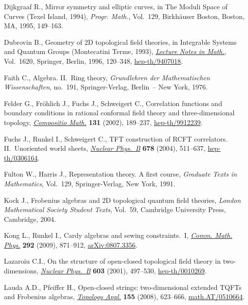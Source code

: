 \documentclass[pdftex]{sigma}
\begin{document}
\begin{thebibliography}{99}
Dijkgraaf  R.,
Mirror symmetry and elliptic curves, in The Moduli Space of Curves (Texel Island, 1994),
{\it Progr. Math.}, Vol.~129, Birkh\"auser Boston, Boston, MA, 1995, 149--163.

Dubrovin B.,
Geometry of 2D topological f\/ield theories,
in Integrable Systems and Quantum Groups (Montecatini Terme, 1993),
\href{http://dx.doi.org/10.1007/BFb0094793}{{\it Lecture Notes in Math.}}, Vol.~1620, Springer, Berlin, 1996, 120--348,
\href{http://arxiv.org/abs/hep-th/9407018}{hep-th/9407018}.


Faith C.,
Algebra. II.~Ring theory,
{\it Grundlehren der Mathematischen Wissenschaften}, no.~191, Springer-Verlag, Berlin~-- New York, 1976.

Felder G., Fr\"ohlich J., Fuchs J., Schweigert C.,
Correlation functions and boundary conditions in rational conformal f\/ield theory and three-dimensional topology,
\href{http://dx.doi.org/10.1023/A:1014903315415}{{\it Compositio Math.}} {\bf 131} (2002), 189--237,
\href{http://arxiv.org/abs/hep-th/9912239}{hep-th/9912239}.


Fuchs J., Runkel I., Schweigert C.,
TFT construction of RCFT correlators. II.~Unoriented world sheets,
\href{http://dx.doi.org/10.1016/j.nuclphysb.2003.11.026}{{\it Nuclear Phys.~B}} {\bf 678} (2004), 511--637,
\href{http://arxiv.org/abs/hep-th/0306164}{hep-th/0306164}.

Fulton W., Harris J.,
Representation theory. A f\/irst course, {\it Graduate Texts in Mathematics}, Vol.~129, Springer-Verlag, New York, 1991.

Kock J.,
Frobenius algebras and 2D topological quantum f\/ield theories,
{\it London Mathematical Society Student Texts}, Vol.~59, Cambridge University Press, Cambridge, 2004.

Kong L., Runkel I.,
Cardy algebras and sewing constraints.~I,
\href{http://dx.doi.org/10.1007/s00220-009-0901-6}{{\it Comm. Math. Phys.}} {\bf  292} (2009), 871--912,
\href{http://arxiv.org/abs/0807.3356}{arXiv:0807.3356}.

Lazaroiu C.I.,
On the structure of open-closed topological f\/ield theory in two-dimensions,
\href{http://dx.doi.org/10.1016/S0550-3213(01)00135-3}{{\it Nuclear Phys.~B}} {\bf 603} (2001), 497--530,
\href{http://arxiv.org/abs/hep-th/0010269}{hep-th/0010269}.

Lauda A.D., Pfeif\/fer H.,
Open-closed strings: two-dimensional extended TQFTs and Frobenius algebras,
\href{http://dx.doi.org/10.1016/j.topol.2007.11.005}{{\it Topology Appl.}} {\bf 155} (2008), 623--666,
\href{http://arxiv.org/abs/math.AT/0510664}{math.AT/0510664}.


\end{thebibliography}
\end{document}
